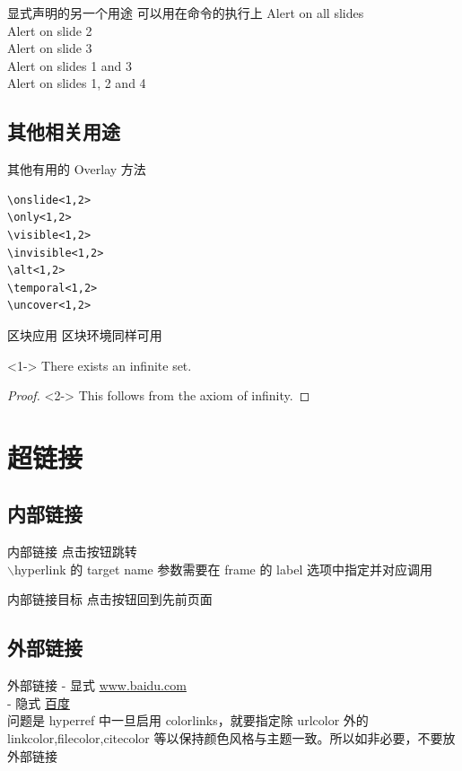 \documentclass[UTF8,14pt,aspectratio=43,dvipsnames,svgnames,x11names,hyperref={urlcolor=blue}]{beamer}
\begin{document}
\begin{frame}{显式声明的另一个用途}
	可以用在命令的执行上  %
	\vskip12pt
	\alert{Alert on all slides}\\
	\alert<2>{Alert on slide 2}\\
	\alert<3>{Alert on slide 3}\\
	\alert<1,3>{Alert on slides 1 and 3}\\
	\alert<-2,4>{Alert on slides 1, 2 and 4}
\end{frame}

\subsection[其他相关用途]{其他相关用途}
\begin{frame}[fragile]{其他有用的 Overlay 方法}
	\begin{verbatim}
\onslide<1,2>
\only<1,2> 
\visible<1,2>
\invisible<1,2>
\alt<1,2> 
\temporal<1,2>
\uncover<1,2> 
\end{verbatim}
\end{frame}

\begin{frame}{区块应用}
	区块环境同样可用
	\begin{theorem}<1->
		There exists an infinite set.
	\end{theorem}
	\begin{proof}<2->
		This follows from the axiom of infinity.
	\end{proof}
\end{frame}

\section[超链接]{超链接}
\subsection[内部链接]{内部链接}
\begin{frame}[label=内部链接]{内部链接}
	点击按钮跳转 \hyperlink{内部链接目标}{}\\
	$\backslash$hyperlink 的 target name 参数需要在 frame 的 label 选项中指定并对应调用
\end{frame}

\begin{frame}[label=内部链接目标]{内部链接目标}
	点击按钮回到先前页面 \hyperlink{内部链接}{}
\end{frame}

\subsection[外部链接]{外部链接}
\begin{frame}{外部链接}
	- 显式 \url{www.baidu.com}\\
	- 隐式 \href{www.baidu.com}{百度}\\
	问题是 hyperref 中一旦启用 colorlinks，就要指定除 urlcolor 外的 linkcolor,filecolor,citecolor 等以保持颜色风格与主题一致。所以如非必要，不要放外部链接
\end{frame}
\end{document}
